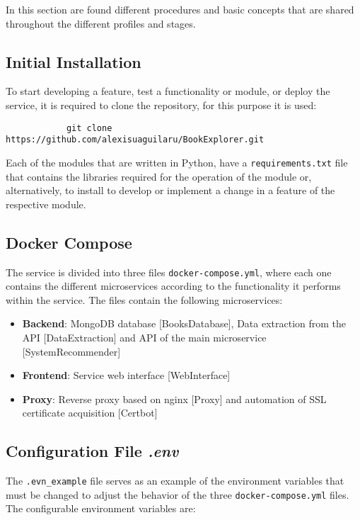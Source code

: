 \documentclass[12pt,a4paper]{article}
\begin{document}
    {
        In this section are found different procedures and basic concepts that 
        are shared throughout the different profiles and stages.

        \subsection{Initial Installation}
        {
            To start developing a feature, test a functionality or module, or 
            deploy the service, it is required to clone the repository, for 
            this purpose it is used:
            
            \begin{verbatim}
            git clone https://github.com/alexisuaguilaru/BookExplorer.git 
            \end{verbatim}

            Each of the modules that are written in Python, have a 
            \verb*|requirements.txt| file that contains the libraries required 
            for the operation of the module or, alternatively, to install to 
            develop or implement a change in a feature of the respective module.
        }

        \subsection{Docker Compose}
        {
            The service is divided into three files \verb*|docker-compose.yml|, 
            where each one contains the different microservices according to the 
            functionality it performs within the service. The files contain the 
            following microservices:

            \begin{itemize}[label=$\bullet$]
                \item \textbf{Backend}: MongoDB database [BooksDatabase], Data extraction 
                from the API [DataExtraction] and API of the main microservice [SystemRecommender]
                \item \textbf{Frontend}: Service web interface [WebInterface] 
                \item \textbf{Proxy}: Reverse proxy based on nginx [Proxy] and automation of SSL 
                certificate acquisition [Certbot]
            \end{itemize}
        }

        \subsection{Configuration File \emph{.env}}
        {
            The \verb*|.evn_example| file serves as an example of the environment 
            variables that must be changed to adjust the behavior of the three 
            \verb*|docker-compose.yml| files. The configurable environment variables are:

}}
\end{document}
